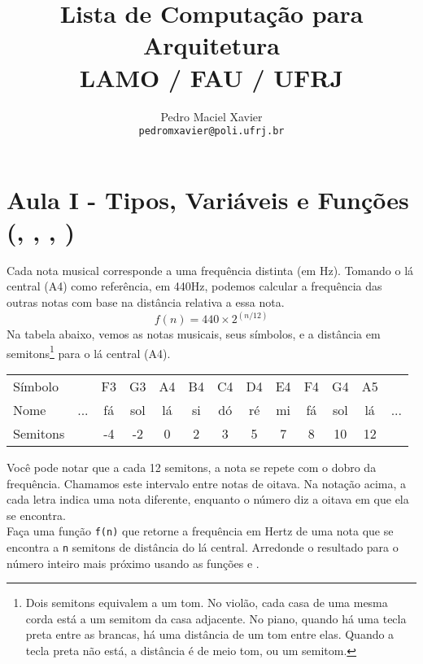 \documentclass[12pt]{article}
\title{%
Lista de Computação para Arquitetura\\
{\normalsize LAMO / FAU / UFRJ}
}
\author{%
Pedro Maciel Xavier \\ 
\texttt{pedromxavier@poli.ufrj.br}
}
\date{}
\begin{document}
	\maketitle
	
	\tableofcontents
	
	
	\pagebreak
	
	
	\section{Aula I - Tipos, Variáveis e Funções \\ (, , , )}
	
	
	Cada nota musical corresponde a uma frequência distinta (em Hz). Tomando o lá central (A4) como referência, em 440Hz, podemos calcular a frequência das outras notas com base na distância relativa a essa nota.
	$$f(n) = 440 \times 2^{(n/12)}$$
	Na tabela abaixo, vemos as notas musicais, seus símbolos, e a distância em semitons\footnote{Dois semitons equivalem a um tom. No violão, cada casa de uma mesma corda está a um semitom da casa adjacente. No piano, quando há uma tecla preta entre as brancas, há uma distância de um tom entre elas. Quando a tecla preta não está, a distância é de meio tom, ou um semitom.} para o lá central (A4).
	
	\begin{center}
		\begin{tabular}{|l|c c c c c c c c c c c c|}
			\hline
			Símbolo &  & F3 & G3 & A4 & B4 & C4 & D4 & E4 & F4 & G4 & A5 & \\
			Nome & ... & fá & sol & lá & si & dó & ré & mi & fá & sol & lá & ... \\
			Semitons &  & -4 & -2 & 0 & 2 & 3 & 5 & 7 & 8 & 10 & 12 & \\
			\hline
		\end{tabular}
	\end{center}

	Você pode notar que a cada 12 semitons, a nota se repete com o dobro da frequência. Chamamos este intervalo entre notas de oitava. Na notação acima, a cada letra indica uma nota diferente, enquanto o número diz a oitava em que ela se encontra.\\
	
	\quest Faça uma função \texttt{f(n)} que retorne a frequência em Hertz de uma nota que se encontra a \texttt{n} semitons de distância do lá central. Arredonde o resultado para o número inteiro mais próximo usando as funções  e .\\
	
\end{document}
